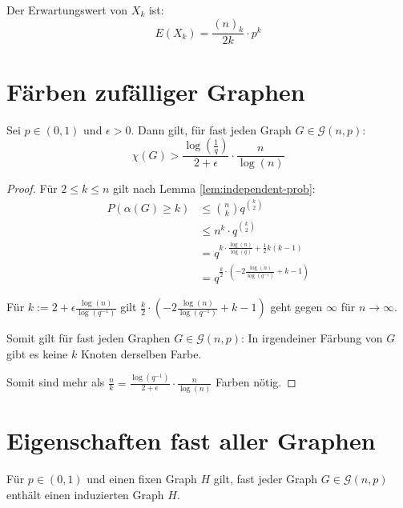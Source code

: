 \begin{proposition}
    Der Erwartungswert von $ X_k $ ist:
    \begin{equation*}
        E(X_k) = \frac{(n)_k}{2k} \cdot p^k
    \end{equation*}
\end{proposition}

\section{Färben zufälliger Graphen}

\begin{proposition}
    Sei $ p \in (0, 1) $ und $ \epsilon > 0 $.
    Dann gilt, für fast jeden Graph $ G \in \mathcal{G}(n, p) $:
    \begin{equation*}
        \chi(G) > \frac{\log(\frac{1}{q})}{2 + \epsilon} \cdot \frac{n}{\log(n)}
    \end{equation*}
\end{proposition}

\begin{proof}
    Für $ 2 \leq k \leq n $ gilt nach Lemma \ref{lem:independent-prob}:
    \begin{align*}
        P(\alpha(G) \geq k) & \leq \binom{n}{k} q^{\binom{k}{2}} \\
        & \leq n^k \cdot q^{\binom{k}{2}} \\
        &= q^{k \cdot \frac{\log(n)}{\log(q)} + \frac{1}{2}k(k - 1)} \\
        &= q^{\frac{k}{2} \cdot (-2 \frac{\log(n)}{\log(q^{-1})} + k - 1)}
    \end{align*}

    Für $ k := 2 + \epsilon \frac{\log(n)}{\log(q^{-1})} $ gilt $ \frac{k}{2} \cdot (-2 \frac{\log(n)}{\log(q^{-1})} + k - 1) $ geht gegen $ \infty $ für $ n \rightarrow \infty $.

    Somit gilt für fast jeden Graphen $ G \in \mathcal{G}(n, p) $: In irgendeiner Färbung von $ G $ gibt es keine $ k $ Knoten derselben Farbe.

    Somit sind mehr als $ \frac{n}{k} = \frac{\log(q^{-1})}{2 + \epsilon} \cdot \frac{n}{\log(n)} $ Farben nötig.
\end{proof}

\section{Eigenschaften fast aller Graphen}

\begin{proposition}
    Für $ p \in (0, 1) $ und einen fixen Graph $ H $ gilt, fast jeder Graph $ G \in \mathcal{G}(n, p) $ enthält einen induzierten Graph $ H $.
\end{proposition}

